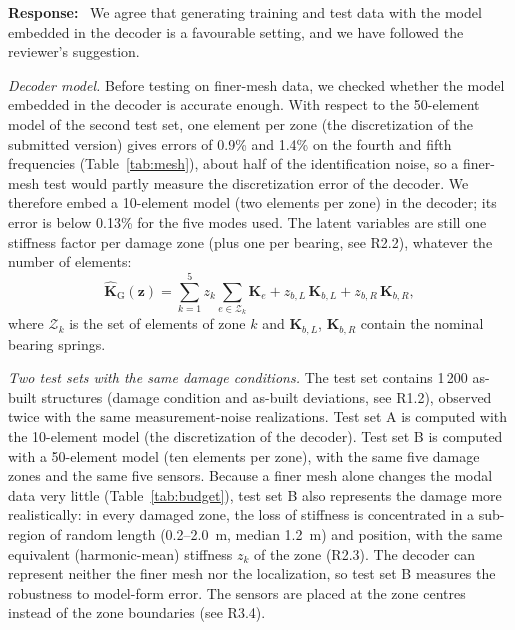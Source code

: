 \documentclass[11pt]{article}
\newenvironment{response}{\par\smallskip\noindent\color{resp}\textbf{Response:}\ }{\par}
\newcommand{\z}{\mathbf{z}}
\begin{document}
\begin{response}
We agree that generating training and test data with the model embedded in the decoder is a favourable setting, and
we have followed the reviewer's suggestion.

\textit{Decoder model.} Before testing on finer-mesh data, we checked whether the model embedded in the decoder is
accurate enough. With respect to the 50-element model of the second test set, one element per zone (the discretization
of the submitted version) gives errors of 0.9\% and 1.4\% on the fourth and fifth frequencies (Table~\ref{tab:mesh}),
about half of the identification noise, so a finer-mesh test would partly measure the discretization error of the
decoder. We therefore embed a 10-element model (two elements per zone) in the decoder; its error is below 0.13\% for the
five modes used. The latent variables are still one stiffness factor per damage zone (plus one per bearing, see R2.2),
whatever the number of elements:
\begin{equation}
\hat{\mathbf{K}}_{\mathrm{G}}(\z)=\sum_{k=1}^{5} z_k\sum_{e\in\mathcal{Z}_k}\mathbf{K}_{e}
+z_{b,L}\,\mathbf{K}_{b,L}+z_{b,R}\,\mathbf{K}_{b,R},
\label{eq:Kz}
\end{equation}
where $\mathcal{Z}_k$ is the set of elements of zone $k$ and $\mathbf{K}_{b,L}$, $\mathbf{K}_{b,R}$ contain the nominal
bearing springs.

\textit{Two test sets with the same damage conditions.} The test set contains 1\,200 as-built structures (damage
condition and as-built deviations, see R1.2), observed twice with the same measurement-noise realizations. Test set A is
computed with the 10-element model (the discretization of the decoder). Test set B is computed with a 50-element model
(ten elements per zone), with the same five damage zones and the same five sensors. Because a finer mesh alone changes
the modal data very little (Table~\ref{tab:budget}), test set B also represents the damage more realistically: in every
damaged zone, the loss of stiffness is concentrated in a sub-region of random length (0.2--2.0~m, median 1.2~m) and
position, with the same equivalent (harmonic-mean) stiffness $z_k$ of the zone (R2.3). The decoder can represent
neither the finer mesh nor the localization, so test set B measures the robustness to model-form error. The sensors are
placed at the zone centres instead of the zone boundaries (see R3.4).


\end{response}
\end{document}
